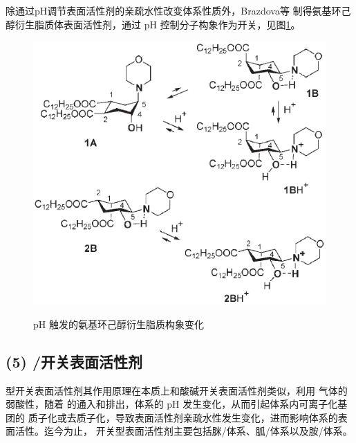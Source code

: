 \documentclass[bachelor,winfonts,replaceperiod]{jnuthesis}
\begin{document}
    除通过pH调节表面活性剂的亲疏水性改变体系性质外，Brazdova\cite{李云霞2011,brazdova2008}等
    制得氨基环己醇衍生脂质体表面活性剂，通过 pH 控制分子构象作为开关，见图\ref{fig:switchable-ph-conformation}。
    \begin{figure}[htbp]
        \centering
        \includegraphics[width=.5\textwidth]{figure/switchable-ph-conformation.png}\\
        \caption{pH 触发的氨基环己醇衍生脂质构象变化\cite{brazdova2008}}
        \label{fig:switchable-ph-conformation}
    \end{figure}

    \subsection*{(5) /开关表面活性剂}
    型开关表面活性剂其作用原理在本质上和酸碱开关表面活性剂类似，利用 
    气体的弱酸性，随着 的通入和排出，体系的 pH 发生变化，从而引起体系内可离子化基团的
    质子化或去质子化，导致表面活性剂亲疏水性发生变化，进而影响体系的表面活性。迄今为止，
    开关型表面活性剂主要包括脒/体系、胍/体系以及胺/体系\cite{梅平2016}。
    
\end{document}
